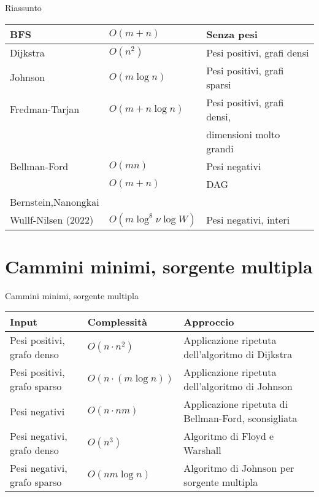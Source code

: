 \begin{frame}{Riassunto}

\vspace{-9pt}

\medskip
\begingroup
\renewcommand*{\arraystretch}{1.2}
\begin{tabular}{|l|l|l|}
\hline
BFS & $O(m+n)$ & Senza pesi \\\hline
Dijkstra & $O(n^2)$ & Pesi positivi, grafi densi \\\hline
Johnson & $O(m \log n)$ & Pesi positivi, grafi sparsi \\\hline
Fredman-Tarjan & $O(m + n \log n)$ & Pesi positivi, grafi densi, \\
& & dimensioni molto grandi  \\\hline
Bellman-Ford & $O(mn)$ & Pesi negativi \\\hline
  & $O(m+n)$ & DAG \\\hline
Bernstein,Nanongkai & & \\
Wullf-Nilsen (2022) & $O(m \log^8 \nu \log W)$ & Pesi negativi, interi \\\hline

\end{tabular}
\endgroup

\end{frame}


\section{Cammini minimi, sorgente multipla}

\vspace{-9pt}
\begin{frame}{Cammini minimi, sorgente multipla}

\vspace{-9pt}

\medskip
\begingroup
\renewcommand*{\arraystretch}{1.2}
\small
\begin{tabular}{|P{2.3cm}|P{2.6cm}|P{5.8cm}|}
\hline
\textbf{Input} & \textbf{Complessità} & \textbf{Approccio} \\\hline
Pesi positivi, grafo denso & $O(n \cdot n^2)$ & Applicazione ripetuta dell'algoritmo di Dijkstra \\\hline
Pesi positivi, grafo sparso & $O(n \cdot (m \log n))$ & Applicazione ripetuta dell'algoritmo di Johnson \\\hline
Pesi negativi & $O(n \cdot nm)$ & Applicazione ripetuta di Bellman-Ford, \alert{sconsigliata} \\\hline
Pesi negativi, grafo denso & $O(n^3)$ & Algoritmo di \alert{Floyd e Warshall} \\\hline
Pesi negativi, grafo sparso & $O(nm \log n)$ & Algoritmo di \alert{Johnson per sorgente multipla} \\\hline
\end{tabular}
\endgroup

\end{frame}

